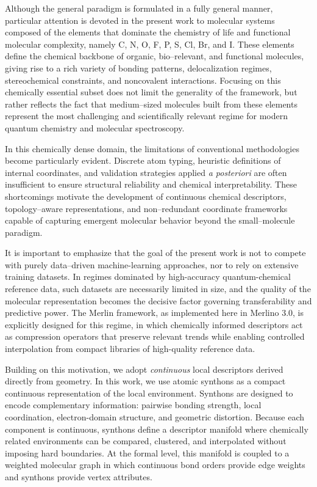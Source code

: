 \documentclass[journal=jctcce,manuscript=article]{achemso}
\begin{document}
Although the general paradigm is formulated in a fully general manner, particular attention is devoted in the present work to molecular systems composed of the elements that dominate the chemistry of life and functional molecular complexity, namely C, N, O, F, P, S, Cl, Br, and I. These elements define the chemical backbone of organic, bio--relevant, and functional molecules, giving rise to a rich variety of bonding patterns, delocalization regimes, stereochemical constraints, and noncovalent interactions. Focusing on this chemically essential subset does not limit the generality of the framework, but rather reflects the fact that medium--sized molecules built from these elements represent the most challenging and scientifically relevant regime for modern quantum chemistry and molecular spectroscopy.

In this chemically dense domain, the limitations of conventional methodologies become particularly evident. Discrete atom typing, heuristic definitions of internal coordinates, and validation strategies applied \emph{a posteriori} are often insufficient to ensure structural reliability and chemical interpretability. These shortcomings motivate the development of continuous chemical descriptors, topology--aware representations, and non--redundant coordinate frameworks capable of capturing emergent molecular behavior beyond the small--molecule paradigm.

It is important to emphasize that the goal of the present work is not to compete with purely data--driven machine-learning approaches, nor to rely on extensive training datasets. In regimes dominated by high-accuracy quantum-chemical reference data, such datasets are necessarily limited in size, and the quality of the molecular representation becomes the decisive factor governing transferability and predictive power. The Merlin framework, as implemented here in Merlino 3.0, is explicitly designed for this regime, in which chemically informed descriptors act as compression operators that preserve relevant trends while enabling controlled interpolation from compact libraries of high-quality reference data.

Building on this motivation, we adopt \emph{continuous} local descriptors derived directly from geometry. In this work, we use atomic synthons as a compact continuous representation of the local environment. Synthons are designed to encode complementary information: pairwise bonding strength, local coordination, electron-domain structure, and geometric distortion. Because each component is continuous, synthons define a descriptor manifold where chemically related environments can be compared, clustered, and interpolated without imposing hard boundaries. At the formal level, this manifold is coupled to a weighted molecular graph in which continuous bond orders provide edge weights and synthons provide vertex attributes.
\end{document}
